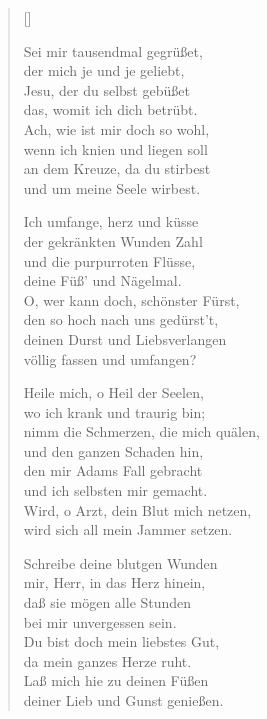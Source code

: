 \begin{multicols}{2}
\settowidth{\versewidth}{Heile mich, o Heil der Seelen,}
\begin{verse}[\versewidth]


 Sei mir tausendmal gegrüßet,\\
der mich je und je geliebt,\\
Jesu, der du selbst gebüßet\\
das, womit ich dich betrübt.\\
Ach, wie ist mir doch so wohl,\\
wenn ich knien und liegen soll\\
an dem Kreuze, da du stirbest\\
und um meine Seele wirbest.

 Ich umfange, herz und küsse\\
der gekränkten Wunden Zahl\\
und die purpurroten Flüsse,\\
deine Füß' und Nägelmal.\\
O, wer kann doch, schönster Fürst,\\
den so hoch nach uns gedürst't,\\
deinen Durst und Liebsverlangen\\
völlig fassen und umfangen?

 Heile mich, o Heil der Seelen,\\
wo ich krank und traurig bin;\\
nimm die Schmerzen, die mich quälen,\\
und den ganzen Schaden hin,\\
den mir Adams Fall gebracht\\
und ich selbsten mir gemacht.\\
Wird, o Arzt, dein Blut mich netzen,\\
wird sich all mein Jammer setzen.

 Schreibe deine blutgen Wunden\\
mir, Herr, in das Herz hinein,\\
daß sie mögen alle Stunden\\
bei mir unvergessen sein.\\
Du bist doch mein liebstes Gut,\\
da mein ganzes Herze ruht.\\
Laß mich hie zu deinen Füßen\\
deiner Lieb und Gunst genießen.

\end{verse}
\end{multicols}


